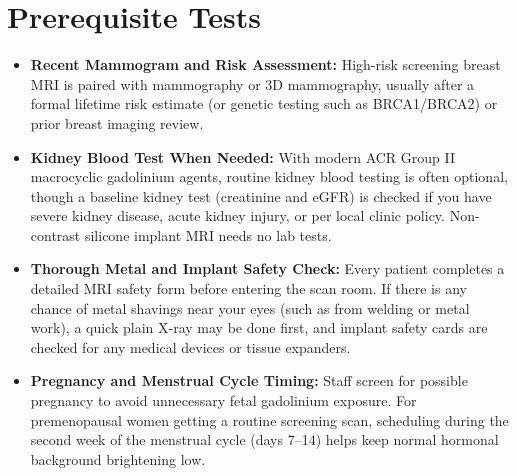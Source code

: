 \section{Prerequisite Tests}
\begin{itemize}
\item \textbf{Recent Mammogram and Risk Assessment:} High-risk screening breast MRI is paired with mammography or 3D mammography, usually after a formal lifetime risk estimate (or genetic testing such as BRCA1/BRCA2) or prior breast imaging review.
\item \textbf{Kidney Blood Test When Needed:} With modern ACR Group II macrocyclic gadolinium agents, routine kidney blood testing is often optional, though a baseline kidney test (creatinine and eGFR) is checked if you have severe kidney disease, acute kidney injury, or per local clinic policy. Non-contrast silicone implant MRI needs no lab tests.
\item \textbf{Thorough Metal and Implant Safety Check:} Every patient completes a detailed MRI safety form before entering the scan room. If there is any chance of metal shavings near your eyes (such as from welding or metal work), a quick plain X-ray may be done first, and implant safety cards are checked for any medical devices or tissue expanders.
\item \textbf{Pregnancy and Menstrual Cycle Timing:} Staff screen for possible pregnancy to avoid unnecessary fetal gadolinium exposure. For premenopausal women getting a routine screening scan, scheduling during the second week of the menstrual cycle (days 7--14) helps keep normal hormonal background brightening low.
\end{itemize}


